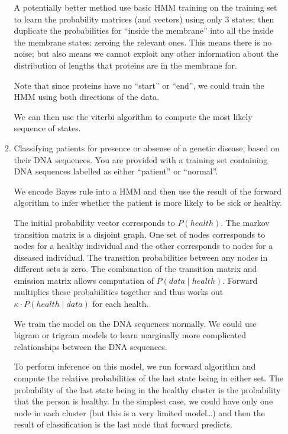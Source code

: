 \documentclass[10pt,\jkfside,a4paper]{article}
\begin{document}
\begin{enumerate}
\begin{enumerate}
        A potentially better method use basic HMM training on the training set to learn the probability matrices (and vectors) using only 3 states; then duplicate the probabilities for ``inside the membrane'' into
        all the inside the membrane states; zeroing the relevant ones. This means there is no noise; but also means we cannot exploit any other information about the distribution of lengths that proteins are in
        the membrane for.

        Note that since proteins have no ``start'' or ``end'', we could train the HMM using both directions of the data.

        We can then use the viterbi algorithm to compute the most likely sequence of states.

        \item Classifying patients for presence or absense of a genetic disease, based on their DNA sequences. You are provided with a training set containing DNA sequences labelled as either ``patient'' or
        ``normal''.

        We encode Bayes rule into a HMM and then use the result of the forward algorithm to infer whether the patient is more likely to be sick or healthy.

        The initial probability vector corresponds to $P(\mathit{health})$. The markov transition matrix is a disjoint graph. One set of nodes corresponds to nodes for a healthy individual and the other
        corresponds to nodes for a diseased individual. The transition probabilities between any nodes in different sets is zero. The combination of the transition matrix and emission matrix allows computation of
        $P(\mathit{data} \mid \mathit{health})$. Forward multiplies these probabilities together and thus works out $\kappa \cdot P(\mathit{health} \mid \mathit{data})$ for each health.

        We train the model on the DNA sequences normally. We could use bigram or trigram models to learn marginally more complicated relationships between the DNA sequences.

        To perform inference on this model, we run forward algorithm and compute the relative probabilities of the last state being in either set. The probability of the last state being in the healthy cluster
        is the probability that the person is healthy. In the simplest case, we could have only one node in each cluster (but this is a very limited model\ldots) and then the result of classification is the last
        node that forward predicts.

    \end{enumerate}

\end{enumerate}
\end{document}
